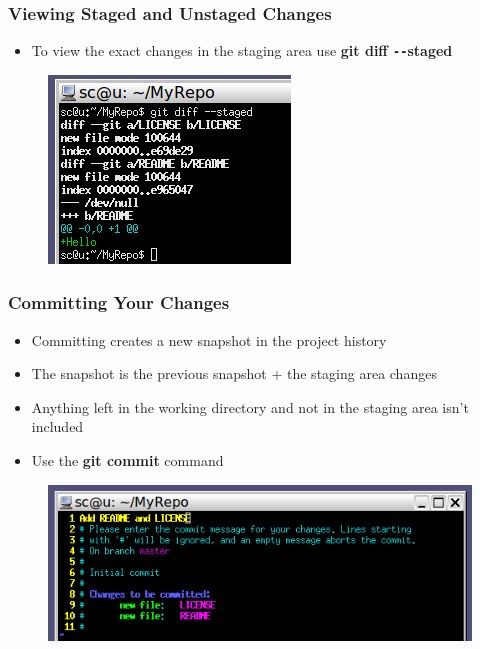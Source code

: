 \documentclass{beamer}
\begin{document}
\begin{frame}
	\frametitle{Viewing Staged and Unstaged Changes}
	\begin{itemize}
		\item{To view the exact changes in the staging area use \textbf{git diff \texttt{-{}-}staged}}
	\end{itemize}
	\begin{figure}
		\includegraphics[scale=0.62]{Viewing_Staged_and_Unstaged_Changes-1.png}
	\end{figure}
\end{frame}

\begin{frame}
	\frametitle{Committing Your Changes}
	\begin{itemize}
		\item{Committing creates a new snapshot in the project history}
		\item{The snapshot is the previous snapshot + the staging area changes}
		\item{Anything left in the working directory and not in the staging area isn't included}
		\item{Use the \textbf{git commit} command}
	\end{itemize}
	\begin{figure}
		\includegraphics[scale=0.62]{Committing_Your_Changes-0.png}
	\end{figure}
\end{frame}
\end{document}
